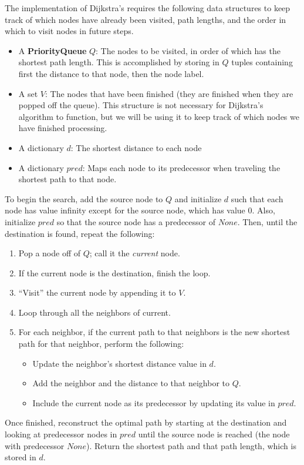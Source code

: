 The implementation of Dijkstra's requires the following data structures to keep track of which nodes have already been visited, path lengths, and the order in which to visit nodes in future steps.
\begin{itemize}
    \item A \textbf{PriorityQueue} $Q$: The nodes to be visited, in order of which has the shortest path length.
        This is accomplished by storing in $Q$ tuples containing first the distance to that node, then the node label.
    \item A set $V$: The nodes that have been finished (they are finished when they are popped off the queue).
        This structure is not necessary for Dijkstra's algorithm to function, but we will be using it to keep track of which nodes we have finished processing.
    \item A dictionary $d$: The shortest distance to each node
    \item A dictionary $pred$: Maps each node to its predecessor when traveling the shortest path to that node.
\end{itemize}
To begin the search, add the source node to $Q$ and initialize $d$ such that each node has value infinity except for the source node, which has value 0.
Also, initialize $pred$ so that the source node has a predecessor of $None$.
Then, until the destination is found, repeat the following:
\begin{enumerate}
    \item Pop a node off of $Q$; call it the \emph{current} node.
    \item If the current node is the destination, finish the loop.
    \item ``Visit'' the current node by appending it to $V$.
    \item Loop through all the neighbors of current.
    \item For each neighbor, if the current path to that neighbors is the new shortest path for that neighbor, perform the following:
    \begin{itemize}
        \item Update the neighbor's shortest distance value in $d$.
        \item Add the neighbor and the distance to that neighbor to $Q$.
        \item Include the current node as its predecessor by updating its value in $pred$.
    \end{itemize}
\end{enumerate}
Once finished, reconstruct the optimal path by starting at the destination and looking at predecessor nodes in $pred$ until the source node is reached (the node with predecessor $None$).
Return the shortest path and that path length, which is stored in $d$.

